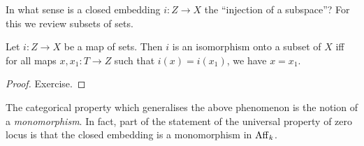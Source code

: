 \documentclass[./main.tex]{subfiles}
\begin{document}
In what sense is a closed embedding $i : Z \to X$ 
the ``injection of a subspace''?
For this we review subsets of sets.

\begin{prop}
  
  Let $i : Z \to X$ be a map of sets.
  Then $i$ is an isomorphism onto a subset of $X$ iff
  for all maps $x , x_1 : T \to Z$ 
  such that $i(x) = i(x_1)$,
  we have $x = x_1$.
\end{prop}
\begin{proof}
  Exercise.
\end{proof}

The categorical property which generalises the above phenomenon
is the notion of a \emph{monomorphism}.
In fact, part of the
statement of the universal property of zero locus
is that the closed embedding is a 
monomorphism in $\mathrm{Aff}_k$.
\end{document}
